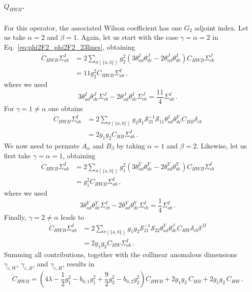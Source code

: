 \subparagraph{\texorpdfstring{$Q_{HWB}$}{Q_HWB}.} For this operator, the associated Wilson coefficient has one $G_2$ adjoint index. Let us take $\alpha=2$ and $\beta=1$. Again, let us start with the case $\gamma=\alpha=2$ in Eq.~\eqref{eq:phi2F2_phi2F2_23lines}, obtaining
\begin{align}
    \dot{C}_{HWB} \Sigma_{ab}^I & = 2 \sum_{\sigma(\{a,b\})} g_2 ^2 \left(3 \theta^I_{ad}\theta^J_{dc} - 2\theta^J_{ad}\theta^I_{dc}\right) C_{HWB} \Sigma_{cb}^J\nonumber\\
    & = 11 g_2^2 C_{HWB} \Sigma_{ab}^I\,,
\end{align}
where we used
\begin{equation}
    3 \theta^I_{ad}\theta^J_{dc}\Sigma_{cb}^J - 2\theta^J_{ad}\theta^I_{dc}\Sigma_{cb}^J = \frac{11}{4} \Sigma_{ab}^I\,.
\end{equation}
For $\gamma=1\ne\alpha$ one obtains
\begin{align}
    \dot{C}_{HWB} \Sigma_{ab}^I & = 2 \sum_{\sigma(\{a,b\})} g_2 g_1 \mathcal{S}_{21}^{-1} \mathcal{S}_{11} \theta^{I}_{ad}\theta^Y_{dc} C_{HB} \delta_{cb}\nonumber\\
    & = 2 g_1 g_2 C_{HB} \Sigma_{ab}^I\,.
\end{align}
We now need to permute $A_\alpha$ and $B_\beta$ by taking $\alpha=1$ and $\beta=2$. Likewise, let us first take $\gamma=\alpha=1$, obtaining 
\begin{align}
    \dot{C}_{HWB} \Sigma_{ab}^I & = 2 \sum_{\sigma(\{a,b\})} g_1 ^2 \left(3 \theta^Y_{ad}\theta^Y_{dc} - 2\theta^Y_{ad}\theta^Y_{dc}\right) C_{HWB} \Sigma_{cb}^I\nonumber\\
    & = g_1^2 C_{HWB} \Sigma_{ab}^I\,,
\end{align}
where we used
\begin{equation}
    3 \theta^Y_{ad}\theta^Y_{dc}\Sigma_{cb}^I - 2\theta^Y_{ad}\theta^Y_{dc}\Sigma_{cb}^I = \frac{1}{4} \Sigma_{ab}^I\,.
\end{equation}
Finally, $\gamma=2\ne\alpha$ leads to
\begin{align}
    \dot{C}_{HWB} \Sigma_{ab}^I & = 2 \sum_{\sigma(\{a,b\})} g_1 g_2 \mathcal{S}_{21}^{-1} \mathcal{S}_{22} \theta^{Y}_{ad}\theta^J_{dc} C_{HW} \delta_{cb} \delta^{JI} \nonumber\\
    & = 2 g_1 g_2 C_{HW} \Sigma_{ab}^I\,.
\end{align}
Summing all contributions, together with the collinear anomalous dimensions $\gamma_{c,W}$, $\gamma_{c,B}$, and $\gamma_{c,H}$, results in
\begin{equation}
     \dot{C}_{HWB} = \left(4\lambda-\frac{1}{2} g_1^2 - b_{0,1}g_1^2 + \frac{9}{2}g_2^2 -b_{0,2}g_2^2\right) C_{HWB} + 2 g_1 g_2 \,C_{HB}+ 2 g_1 g_2 \,C_{HW}\,.
\end{equation}

